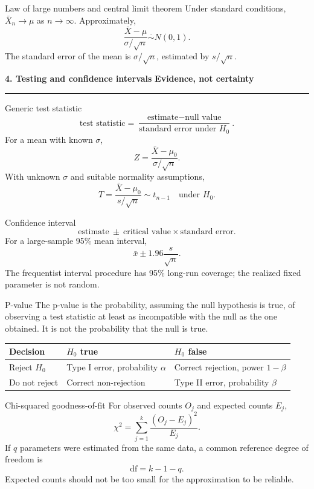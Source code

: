\documentclass[10pt,a4paper]{article}
\newcommand{\sectionbanner}[2]{%
  \vspace{2mm}
  {\color{navy}\Large\bfseries #1}\hfill
  {\color{blue}\bfseries #2}
  \par\vspace{1mm}\color{line}\rule{\linewidth}{0.8pt}\color{ink}\vspace{2mm}
}
\begin{document}
\begin{formulabox}{Law of large numbers and central limit theorem}
Under standard conditions, $\bar X_n\to\mu$ as $n\to\infty$. Approximately,
\[
\frac{\bar X-\mu}{\sigma/\sqrt n}\overset{\cdot}{\sim}N(0,1).
\]
The standard error of the mean is $\sigma/\sqrt n$, estimated by $s/\sqrt n$.
\end{formulabox}

\sectionbanner{4. Testing and confidence intervals}{Evidence, not certainty}

\begin{formulabox}{Generic test statistic}
\[
\text{test statistic}=
\frac{\text{estimate}-\text{null value}}
{\text{standard error under }H_0}.
\]
For a mean with known $\sigma$,
\[
Z=\frac{\bar X-\mu_0}{\sigma/\sqrt n}.
\]
With unknown $\sigma$ and suitable normality assumptions,
\[
T=\frac{\bar X-\mu_0}{s/\sqrt n}\sim t_{n-1}\quad\text{under }H_0.
\]
\end{formulabox}

\begin{formulabox}{Confidence interval}
\[
\text{estimate}\ \pm\ \text{critical value}\times\text{standard error}.
\]
For a large-sample 95\% mean interval,
\[
\bar x\pm1.96\frac{s}{\sqrt n}.
\]
The frequentist interval procedure has 95\% long-run coverage; the realized fixed parameter is not random.
\end{formulabox}

\begin{keybox}{P-value}
The p-value is the probability, assuming the null hypothesis is true, of observing a test statistic at least as incompatible with the null as the one obtained. It is not the probability that the null is true.
\end{keybox}

\begin{tabularx}{\linewidth}{@{}lXX@{}}
\toprule
Decision & $H_0$ true & $H_0$ false \\
\midrule
Reject $H_0$ & Type I error, probability $\alpha$ & Correct rejection, power $1-\beta$ \\
Do not reject & Correct non-rejection & Type II error, probability $\beta$ \\
\bottomrule
\end{tabularx}

\begin{formulabox}{Chi-squared goodness-of-fit}
For observed counts $O_j$ and expected counts $E_j$,
\[
\chi^2=\sum_{j=1}^{k}\frac{(O_j-E_j)^2}{E_j}.
\]
If $q$ parameters were estimated from the same data, a common reference degree of freedom is
\[
\mathrm{df}=k-1-q.
\]
Expected counts should not be too small for the approximation to be reliable.
\end{formulabox}
\end{document}
